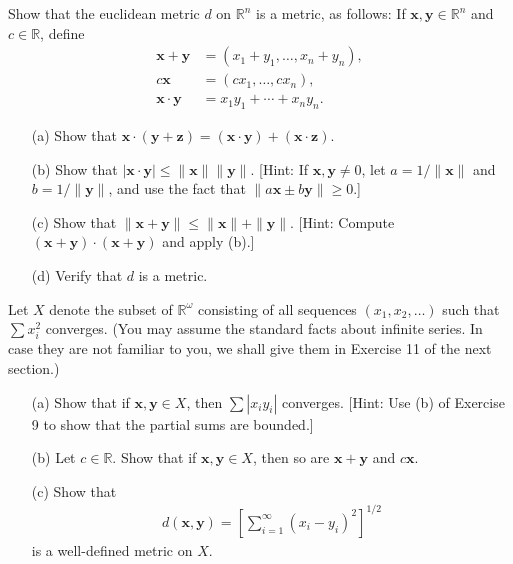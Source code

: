 \begin{exercise}[Munkres 20.9]
  Show that the euclidean metric $d$ on $\mathbb{R}^n$ is a metric, as follows: If $\mathbf{x}, \mathbf{y} \in \mathbb{R}^n$ and $c \in \mathbb{R}$, define
  \begin{align*}
    \mathbf{x} + \mathbf{y} &= (x_1 + y_1, \ldots, x_n + y_n), \\
    c\mathbf{x} &= (cx_1, \ldots, cx_n), \\
    \mathbf{x} \cdot \mathbf{y} &= x_1y_1 + \cdots + x_ny_n.
  \end{align*}
  \begin{enumerate} 
    \item[(a)] Show that $\mathbf{x} \cdot (\mathbf{y} + \mathbf{z}) = (\mathbf{x} \cdot \mathbf{y}) + (\mathbf{x} \cdot \mathbf{z})$.
    \item[(b)] Show that $|\mathbf{x}\cdot\mathbf{y}| \leq \|\mathbf{x}\|\|\mathbf{y}\|$. [Hint: If $\mathbf{x}, \mathbf{y} \neq 0$, let $a = 1/\|\mathbf{x}\|$ and $b = 1/\|\mathbf{y}\|$, and use the fact that $\|a\mathbf{x} \pm b\mathbf{y}\| \geq 0$.]
    \item[(c)] Show that $\|\mathbf{x} + \mathbf{y}\| \leq \|\mathbf{x}\| + \|\mathbf{y}\|$. [Hint: Compute $(\mathbf{x} + \mathbf{y}) \cdot (\mathbf{x} + \mathbf{y})$ and apply (b).]
    \item[(d)] Verify that $d$ is a metric.
  \end{enumerate}
\end{exercise}

\begin{exercise}[Munkres 20.10]
  Let $X$ denote the subset of $\mathbb{R}^\omega$ consisting of all sequences $(x_1, x_2, \ldots)$ such that $\sum x_i^2$ converges. (You may assume the standard facts about infinite series. In case they are not familiar to you, we shall give them in Exercise 11 of the next section.)
  \begin{enumerate} 
    \item[(a)] Show that if $\mathbf{x}, \mathbf{y} \in X$, then $\sum |x_i y_i|$ converges. [Hint: Use (b) of Exercise 9 to show that the partial sums are bounded.]
    \item[(b)] Let $c \in \mathbb{R}$. Show that if $\mathbf{x}, \mathbf{y} \in X$, then so are $\mathbf{x} + \mathbf{y}$ and $c\mathbf{x}$.
    \item[(c)] Show that
    \begin{align*}
      d(\mathbf{x}, \mathbf{y}) = \left[\sum_{i=1}^{\infty}(x_i - y_i)^2\right]^{1/2}
    \end{align*}
    is a well-defined metric on $X$.
  \end{enumerate}
\end{exercise}

